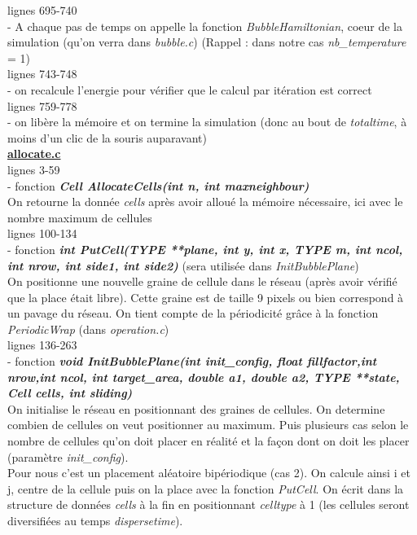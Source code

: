\documentclass[11pt,a4paper]{article}
\begin{document}
lignes 695-740\\
- A chaque pas de temps on appelle la fonction \textit{BubbleHamiltonian}, coeur de la simulation (qu’on verra dans \textit{bubble.c}) (Rappel : dans notre cas \textit{nb\_temperature} = 1)\\

lignes 743-748\\
- on recalcule l’energie pour vérifier que le calcul par itération est correct\\

lignes 759-778\\
- on libère la mémoire et on termine la simulation (donc au bout de \textit{totaltime}, à moins d’un clic de la souris auparavant)\\



\underline{\textbf{allocate.c}}\\

lignes 3-59\\
- fonction \textit{\textbf{Cell AllocateCells(int n, int maxneighbour)}}\\
On retourne la donnée \textit{cells} après avoir alloué la mémoire nécessaire, ici avec le nombre maximum de cellules\\

lignes 100-134\\
- fonction \textbf{\textit{int PutCell(TYPE **plane, int y, int x, TYPE m, int ncol, int nrow, int side1, int side2)}}
(sera utilisée dans \textit{InitBubblePlane})\\
On positionne une nouvelle graine de cellule dans le réseau (après avoir vérifié que la place était libre). Cette graine est de taille 9 pixels ou bien correspond à un pavage du réseau. On tient compte de la périodicité grâce à la fonction \textit{PeriodicWrap} (dans \textit{operation.c})\\

lignes 136-263\\
- fonction \textit{\textbf{void InitBubblePlane(int init\_config, float fillfactor,int nrow,int ncol, int target\_area, double a1, double a2, TYPE **state, Cell cells, int sliding)}} \\
On initialise le réseau en positionnant des graines de cellules.
On determine combien de cellules on veut positionner au maximum. Puis plusieurs cas selon le nombre de cellules qu’on doit placer en réalité et la façon dont on doit les placer (paramètre \textit{init\_config}).\\ 
Pour nous c’est un placement aléatoire bipériodique (cas 2). On calcule ainsi i et j, centre de la cellule puis on la place avec la fonction \textit{PutCell}. On écrit dans la structure de données \textit{cells} à la fin en positionnant \textit{celltype} à 1 (les cellules seront diversifiées au temps \textit{dispersetime}).\\
\end{document}
